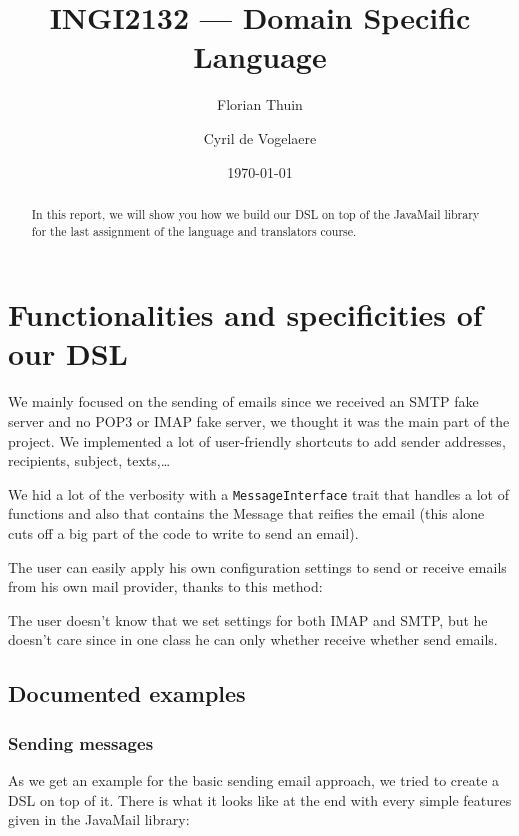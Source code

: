\documentclass[a4paper, 11pt]{article}
\author{Florian Thuin \and Cyril de Vogelaere}
\date{\today}
\title{INGI2132 --- Domain Specific Language}
\begin{document}
    \maketitle

    \begin{abstract}
        In this report, we will show you how we build our DSL on top of the
        JavaMail library for the last assignment of the language and translators
        course.
    \end{abstract}

    \section{Functionalities and specificities of our DSL}

    We mainly focused on the sending of emails since we received an SMTP fake
    server and no POP3 or IMAP fake server, we thought it was the main part
    of the project. We implemented a lot of user-friendly shortcuts to add
    sender addresses, recipients, subject, texts,\ldots

    We hid a lot of the verbosity with a \verb#MessageInterface# trait that
    handles a lot of functions and also that contains the Message that reifies
    the email (this alone cuts off a big part of the code to write to send
    an email). \newline

    The user can easily apply his own configuration settings to send or receive
    emails from his own mail provider, thanks to this method:

    

    The user doesn't know that we set settings for both IMAP and SMTP, but he
    doesn't care since in one class he can only whether receive whether send
    emails.

    \subsection{Documented examples}
    \subsubsection{Sending messages}
    As we get an example for the basic sending email approach, we tried to
    create a DSL on top of it. There is what it looks like at the end with
    every simple features given in the JavaMail library:
\end{document}
